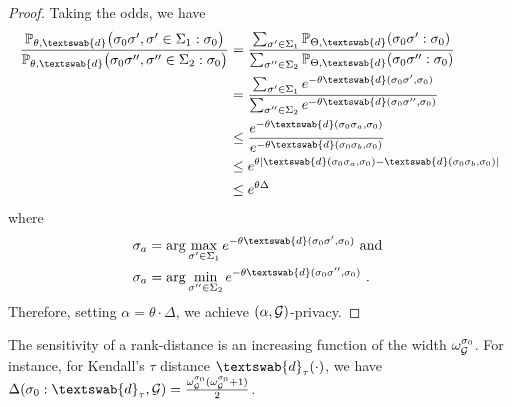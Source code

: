 \begin{proof}
Taking the odds, we have
\begin{align*}
     \frac{\mathbb{P}_{\theta,\textswab{d}}\big(\sigma_0\sigma', \sigma' \in \Sigma_1 : \sigma_0\big)}{
     \mathbb{P}_{\theta,\textswab{d}}\big(\sigma_0\sigma'', \sigma'' \in \Sigma_2 : \sigma_0\big)} 
    &= \frac{\sum_{\sigma' \in \Sigma_1}\mathbb{P}_{\Theta,\textswab{d}}(\sigma_0\sigma' : \sigma_0)}{
    \sum_{\sigma'' \in \Sigma_2}\mathbb{P}_{\Theta,\textswab{d}}(\sigma_0\sigma'' : \sigma_0)} \\
    &=\frac{\sum_{\sigma' \in \Sigma_1} e^{-\theta \textswab{d}(\sigma_0\sigma', \sigma_0)}}{
    \sum_{\sigma'' \in \Sigma_2} e^{-\theta \textswab{d}(\sigma_0\sigma'', \sigma_0)}}\\
    &\leq \frac{e^{-\theta \textswab{d}(\sigma_0\sigma_a, \sigma_0)}}{e^{-\theta \textswab{d}(\sigma_0\sigma_b, \sigma_0)}} \\
    &\leq e^{\theta|  \textswab{d}(\sigma_0\sigma_a, \sigma_0) - \textswab{d}(\sigma_0\sigma_b, \sigma_0) |} \\
    &\leq e^{\theta \Delta}
\end{align*}
where 
\begin{align*}
    \sigma_a &= \arg \max_{\sigma' \in \Sigma_1} e^{-\theta \textswab{d}(\sigma_0 \sigma', \sigma_0)} 
    \text{ and } \\
    \sigma_a &= \arg \min_{\sigma'' \in \Sigma_2} e^{-\theta \textswab{d}(\sigma_0 \sigma'', \sigma_0)} ~.
\end{align*}
Therefore, setting $\alpha = \theta \cdot \Delta$, we achieve $(\alpha, \mathcal{G})$-\name privacy. 
\end{proof}

\begin{prope}
\label{prope:2}
The sensitivity of a rank-distance is an increasing function of the width $\omega_{\mathcal{G}}^{\sigma_0}$. For instance, for Kendall's $\tau$ distance $\textswab{d}_\tau(\cdot )$, we have 
$\Delta(\sigma_0 : \textswab{d}_\tau, \calG)
    =\frac{\omega_{\calG}^{\sigma_0}(\omega_{\calG}^{\sigma_0} + 1)}{2}$. 
\end{prope}
 
